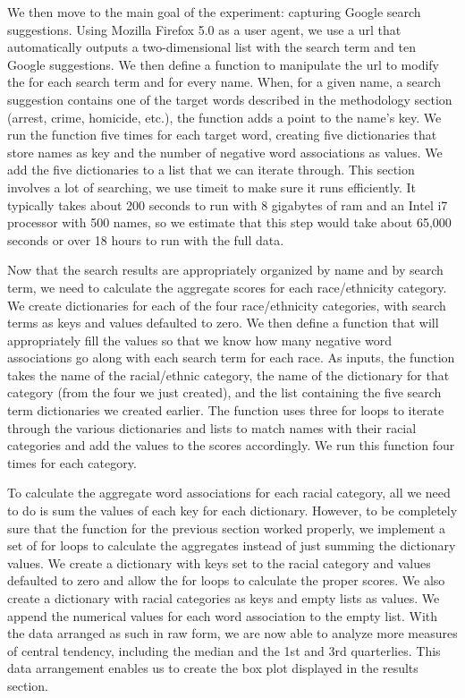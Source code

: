 \documentclass[sigconf]{acmart}
\begin{document}
We then move to the main goal of the experiment: capturing Google search suggestions. Using Mozilla Firefox 5.0 as a user agent, we use a url that automatically outputs a two-dimensional list with the search term and ten Google suggestions. We then define a function to manipulate the url to modify the for each search term and for every name. When, for a given name, a search suggestion contains one of the target words described in the methodology section (arrest, crime, homicide, etc.), the function adds a point to the name's key. We run the function five times for each target word, creating five dictionaries that store names as key and the number of negative word associations as values. We add the five dictionaries to a list that we can iterate through. This section involves a lot of searching, we use timeit to make sure it runs efficiently. It typically takes about 200 seconds to run with 8 gigabytes of ram and an Intel i7 processor with 500 names, so we estimate that this step would take about 65,000 seconds or over 18 hours to run with the full data.

Now that the search results are appropriately organized by name and by search term, we need to calculate the aggregate scores for each race/ethnicity category. We create dictionaries for each of the four race/ethnicity categories, with search terms as keys and values defaulted to zero. We then define a function that will appropriately fill the values so that we know how many negative word associations go along with each search term for each race. As inputs, the function takes the name of the racial/ethnic category, the name of the dictionary for that category (from the four we just created), and the list containing the five search term dictionaries we created earlier. The function uses three for loops to iterate through the various dictionaries and lists to match names with their racial categories and add the values to the scores accordingly. We run this function four times for each category.

To calculate the aggregate word associations for each racial category, all we need to do is sum the values of each key for each dictionary. However, to be completely sure that the function for the previous section worked properly, we implement a set of for loops to calculate the aggregates instead of just summing the dictionary values. We create a dictionary with keys set to the racial category and values defaulted to zero and allow the for loops to calculate the proper scores. We also create a dictionary with racial categories as keys and empty lists as values. We append the numerical values for each word association to the empty list. With the data arranged as such in raw form, we are now able to analyze more measures of central tendency, including the median and the 1st and 3rd quarterlies. This data arrangement enables us to create the box plot displayed in the results section.
\end{document}
